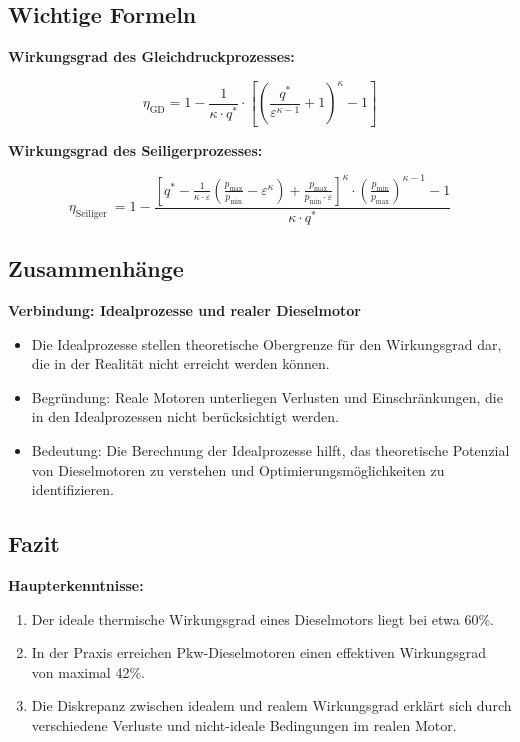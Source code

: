 \documentclass[a4paper,12pt]{article}
\begin{document}
\subsection{Wichtige Formeln}

\textbf{Wirkungsgrad des Gleichdruckprozesses:}

$$ \eta_{\mathrm{GD}}=1-\frac{1}{\kappa \cdot q^{*}} \cdot\left[\left(\frac{q^{*}}{\varepsilon^{\kappa-1}}+1\right)^{\kappa}-1\right] $$

\textbf{Wirkungsgrad des Seiligerprozesses:}

$$ \eta_{\text {Seiliger }}=1-\frac{\left[q^{*}-\frac{1}{\kappa \cdot \varepsilon}\left(\frac{p_{\max }}{p_{\min }}-\varepsilon^{\kappa}\right)+\frac{p_{\max }}{p_{\min } \cdot \varepsilon}\right]^{\kappa} \cdot\left(\frac{p_{\min }}{p_{\max }}\right)^{\kappa-1}-1}{\kappa \cdot q^{*}} $$

\subsection{Zusammenhänge}

\textbf{Verbindung: Idealprozesse und realer Dieselmotor}

\begin{itemize}
    \item Die Idealprozesse stellen theoretische Obergrenze für den Wirkungsgrad dar, die in der Realität nicht erreicht werden können.
    \item Begründung: Reale Motoren unterliegen Verlusten und Einschränkungen, die in den Idealprozessen nicht berücksichtigt werden.
    \item Bedeutung: Die Berechnung der Idealprozesse hilft, das theoretische Potenzial von Dieselmotoren zu verstehen und Optimierungsmöglichkeiten zu identifizieren.
\end{itemize}

\subsection{Fazit}

\textbf{Haupterkenntnisse:}

\begin{enumerate}
    \item Der ideale thermische Wirkungsgrad eines Dieselmotors liegt bei etwa 60\%.
    \item In der Praxis erreichen Pkw-Dieselmotoren einen effektiven Wirkungsgrad von maximal 42\%.
    \item Die Diskrepanz zwischen idealem und realem Wirkungsgrad erklärt sich durch verschiedene Verluste und nicht-ideale Bedingungen im realen Motor.
\end{enumerate}
\end{document}

